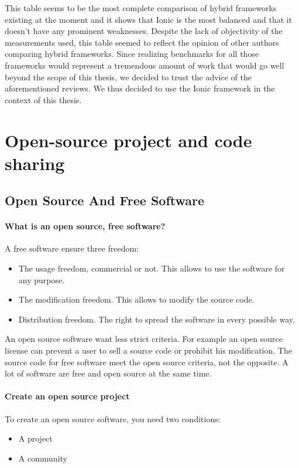 \documentclass{eplmastersthesis}
\begin{document}
This table seems to be the most complete comparison of hybrid frameworks existing at the moment and it shows that Ionic is the most balanced and that it doesn't have any prominent weaknesses. Despite the lack of objectivity of the measurements used, this table seemed to reflect the opinion of other authors comparing hybrid frameworks. Since realizing benchmarks for all those frameworks would represent a tremendous amount of work that would go well beyond the scope of this thesis, we decided to trust the advice of the aforementioned reviews. We thus decided to use the Ionic framework in the context of this thesis.
\section{Open-source project and code sharing}


\subsection{Open Source And Free Software}
\paragraph{What is an open source, free software?\\}
A free software ensure three freedom:
\begin{itemize}
\item The usage freedom, commercial or not. This allows to use the software for any purpose.
\item The modification freedom. This allows to modify the source code.
\item Distribution freedom. The right to spread the software in every possible way.   	 
\end{itemize} 
An open source software want less strict criteria. For example an open source license can prevent a user to sell a source code or prohibit his modification. The source code for free software meet the open source criteria, not the opposite. A lot of software are free and open source at the same time.

\paragraph{Create an open source project\\}
To create an open source software, you need two conditions:
\begin{itemize}
\item A project
\item A community
\end{itemize}
\end{document}
